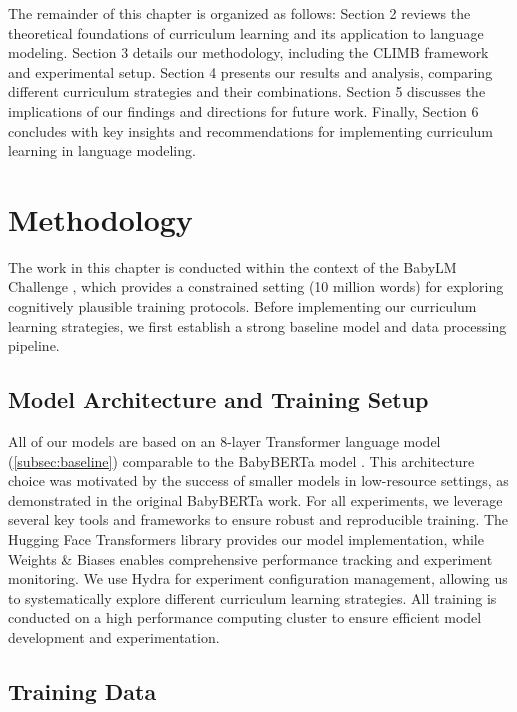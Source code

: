The remainder of this chapter is organized as follows: Section 2 reviews the theoretical foundations of curriculum learning and its application to language modeling. Section 3 details our methodology, including the CLIMB framework and experimental setup. Section 4 presents our results and analysis, comparing different curriculum strategies and their combinations. Section 5 discusses the implications of our findings and directions for future work. Finally, Section 6 concludes with key insights and recommendations for implementing curriculum learning in language modeling.

\section{Methodology}

The work in this chapter is conducted within the context of the BabyLM Challenge \citep{warstadt2023babylm1}, which provides a constrained setting (10 million words) for exploring cognitively plausible training protocols. Before implementing our curriculum learning strategies, we first establish a strong baseline model and data processing pipeline. 

\subsection{Model Architecture and Training Setup}
All of our models are based on an 8-layer Transformer language model (\cref{subsec:baseline}) comparable to the BabyBERTa model \cite{huebner2021babyberta}. This architecture choice was motivated by the success of smaller models in low-resource settings, as demonstrated in the original BabyBERTa work. For all experiments, we leverage several key tools and frameworks to ensure robust and reproducible training. The Hugging Face Transformers library \cite{transformers} provides our model implementation, while Weights \& Biases \cite{wandb} enables comprehensive performance tracking and experiment monitoring. We use Hydra \cite{hydra} for experiment configuration management, allowing us to systematically explore different curriculum learning strategies. All training is conducted on a high performance computing cluster to ensure efficient model development and experimentation.

\subsection{Training Data}
\label{subsec:data}

